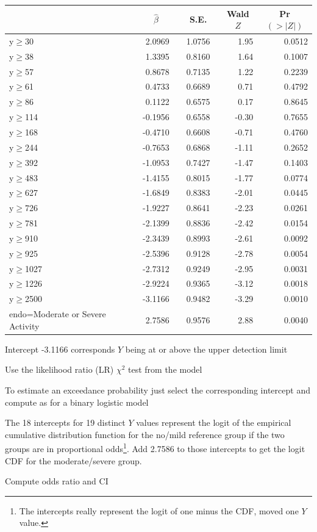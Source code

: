 { %
 \setlongtables\begin{longtable}{lrrrr}\hline
 \multicolumn{1}{l}{}&\multicolumn{1}{c}{$\hat{\beta}$}&\multicolumn{1}{c}{S.E.}&\multicolumn{1}{c}{Wald $Z$}&\multicolumn{1}{c}{Pr$(>|Z|)$}\tabularnewline
 \hline
 \endhead
 \hline
 \endfoot
 y$\geq$30&~ 2.0969~&~1.0756~& 1.95&0.0512\tabularnewline
 y$\geq$38&~ 1.3395~&~0.8160~& 1.64&0.1007\tabularnewline
 y$\geq$57&~ 0.8678~&~0.7135~& 1.22&0.2239\tabularnewline
 y$\geq$61&~ 0.4733~&~0.6689~& 0.71&0.4792\tabularnewline
 y$\geq$86&~ 0.1122~&~0.6575~& 0.17&0.8645\tabularnewline
 y$\geq$114&~-0.1956~&~0.6558~&-0.30&0.7655\tabularnewline
 y$\geq$168&~-0.4710~&~0.6608~&-0.71&0.4760\tabularnewline
 y$\geq$244&~-0.7653~&~0.6868~&-1.11&0.2652\tabularnewline
 y$\geq$392&~-1.0953~&~0.7427~&-1.47&0.1403\tabularnewline
 y$\geq$483&~-1.4155~&~0.8015~&-1.77&0.0774\tabularnewline
 y$\geq$627&~-1.6849~&~0.8383~&-2.01&0.0445\tabularnewline
 y$\geq$726&~-1.9227~&~0.8641~&-2.23&0.0261\tabularnewline
 y$\geq$781&~-2.1399~&~0.8836~&-2.42&0.0154\tabularnewline
 y$\geq$910&~-2.3439~&~0.8993~&-2.61&0.0092\tabularnewline
 y$\geq$925&~-2.5396~&~0.9128~&-2.78&0.0054\tabularnewline
 y$\geq$1027&~-2.7312~&~0.9249~&-2.95&0.0031\tabularnewline
 y$\geq$1226&~-2.9224~&~0.9365~&-3.12&0.0018\tabularnewline
 y$\geq$2500&~-3.1166~&~0.9482~&-3.29&0.0010\tabularnewline
 endo=Moderate or Severe Activity&~ 2.7586~&~0.9576~& 2.88&0.0040\tabularnewline
 \hline
 \end{longtable}
 \addtocounter{table}{-1}

}
\item Intercept -3.1166 corresponds $Y$ being at or above the upper detection limit
\item Use the likelihood ratio (LR) $\chi^2$ test from the model
\item To estimate an exceedance probability just select the corresponding intercept and compute as for a binary logistic model
\item The 18 intercepts for 19 distinct $Y$ values represent the logit of the empirical cumulative distribution function for the no/mild reference group if the two groups are in proportional odds\footnote{The intercepts really represent the logit of one minus the CDF, moved one $Y$ value.}.  Add 2.7586 to those intercepts to get the logit CDF for the moderate/severe group.
\item Compute odds ratio and CI
